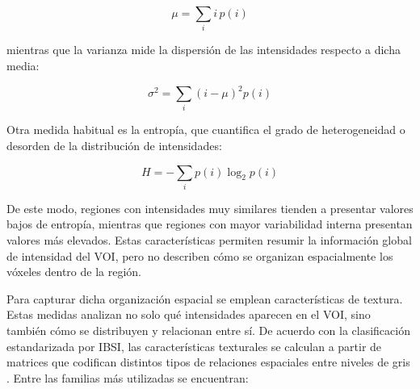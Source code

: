 \[
\mu = \sum_i i \, p(i)
\]

mientras que la varianza mide la dispersión de las intensidades respecto a dicha media:

\[
\sigma^2 = \sum_i (i-\mu)^2 p(i)
\]

Otra medida habitual es la entropía, que cuantifica el grado de heterogeneidad o desorden de la distribución de intensidades:

\[
H = -\sum_i p(i)\log_2 p(i)
\]

De este modo, regiones con intensidades muy similares tienden a presentar valores bajos de entropía, mientras que regiones con mayor variabilidad interna presentan valores más elevados. Estas características permiten resumir la información global de intensidad del VOI, pero no describen cómo se organizan espacialmente los vóxeles dentro de la región.

Para capturar dicha organización espacial se emplean características de textura. Estas medidas analizan no solo qué intensidades aparecen en el VOI, sino también cómo se distribuyen y relacionan entre sí. De acuerdo con la clasificación estandarizada por IBSI, las características texturales se calculan a partir de matrices que codifican distintos tipos de relaciones espaciales entre niveles de gris \cite{Zwanenburg2020}. Entre las familias más utilizadas se encuentran:

